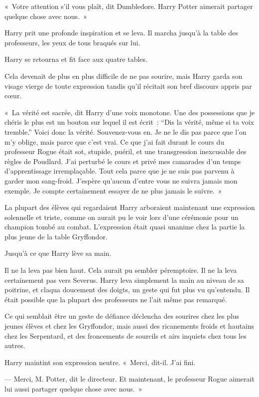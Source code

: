 «~Votre attention s'il vous plaît, dit Dumbledore.
Harry Potter aimerait partager quelque chose avec nous.~»

Harry prit une profonde inspiration et se leva.
Il marcha jusqu'à la table des professeurs, les yeux de tous braqués sur lui.

Harry se retourna et fit face aux quatre tables.

Cela devenait de plus en plus difficile de ne pas sourire, mais Harry garda son visage vierge de toute expression tandis qu'il récitait son bref discours appris par cœur.

«~La vérité est sacrée, dit Harry d'une voix monotone.
Une des possessions que je chéris le plus est un bouton sur lequel il est écrit~: “Dis la vérité, même si ta voix tremble.” Voici donc la vérité.
Souvenez-vous en.
Je ne le dis pas parce que l'on m'y oblige, mais parce que c'est vrai.
Ce que j'ai fait durant le cours du professeur Rogue était sot, stupide, puéril, et une transgression inexcusable des règles de Poudlard.
J'ai perturbé le cours et privé mes camarades d'un temps d'apprentissage irremplaçable.
Tout cela parce que je ne suis pas parvenu à garder mon sang-froid.
J'espère qu'aucun d'entre vous ne suivra jamais mon exemple.
Je compte certainement essayer de ne plus jamais le suivre.~»

La plupart des élèves qui regardaient Harry arboraient maintenant une expression solennelle et triste, comme on aurait pu le voir lors d'une cérémonie pour un champion tombé au combat.
L'expression était quasi unanime chez la partie la plus jeune de la table Gryffondor.

Jusqu'à ce que Harry lève sa main.

Il ne la leva pas bien haut.
Cela aurait pu sembler péremptoire.
Il ne la leva certainement pas vers Severus.
Harry leva simplement la main au niveau de sa poitrine, et claqua doucement des doigts, un geste qui fut plus vu qu'entendu.
Il était possible que la plupart des professeurs ne l'ait même pas remarqué.

Ce qui semblait être un geste de défiance déclencha des sourires chez les plus jeunes élèves et chez les Gryffondor, mais aussi des ricanements froids et hautains chez les Serpentard, et des froncements de sourcils et airs inquiets chez tous les autres.

Harry maintint son expression neutre.
«~Merci, dit-il. J'ai fini.

--- Merci, M. Potter, dit le directeur.
Et maintenant, le professeur Rogue aimerait lui aussi partager quelque chose avec nous.~»

